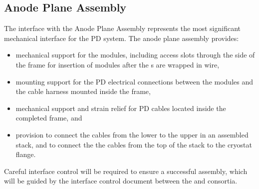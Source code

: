 \subsection{Anode Plane Assembly}

The interface with the Anode Plane Assembly represents the most significant mechanical interface for the PD system.  The anode plane assembly provides:

\begin{itemize}

\item mechanical support for the  modules, including access slots through the side of the frame for insertion of modules after the s are wrapped in wire,

\item mounting support for the PD electrical connections between the  modules and the cable harness mounted inside the  frame,

\item mechanical support and strain relief for PD cables located inside the completed  frame, and

\item provision to connect the  cables from the lower  to the upper  in an assembled  stack, and to connect the the 
cables from the top of the  stack to the cryostat flange.

\end{itemize}

Careful interface control will be required to ensure a successful assembly, which will be guided by the interface control document between the  and  consortia.








